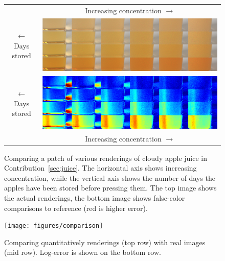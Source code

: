 \begin{figure}[t]
\centering
\begin{tabular}{@{}c@{}c@{}}
	 & Increasing concentration $\longrightarrow$ \\
	\begin{sideways}\hspace{1em}$\longleftarrow$ Days stored \end{sideways} \hspace{0.5mm} &\includegraphics[width=0.9\columnwidth]{figures/comparison_renderings.png} \\
	 \begin{sideways}\hspace{1em}$\longleftarrow$ Days stored \end{sideways} \hspace{0.5mm} &\includegraphics[width=0.9\columnwidth]{figures/comparison_diff.png}  \\
	 & Increasing concentration $\longrightarrow$

\end{tabular}
\caption{Comparing a patch of various renderings of cloudy apple juice in Contribution~\ref{sec:juice}. The horizontal axis shows increasing concentration, while the vertical axis shows the number of days the apples have been stored before pressing them. The top image shows the actual renderings, the bottom image shows false-color comparisons to reference (red is higher error).}
\label{fig:juicecomparisondetail}
\end{figure}

\begin{figure}
\centering
 \texttt{[image: figures/comparison]} 
\caption{Comparing quantitatively renderings (top row) with real images (mid row). Log-error is shown on the bottom row.}
\label{fig:glasscomparison}
\end{figure}


